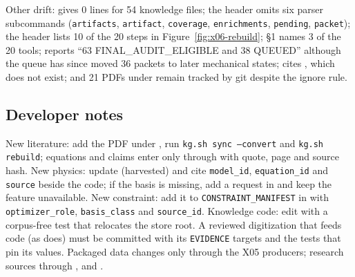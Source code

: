 
Other drift:  gives 0 lines for 54 knowledge files; the  header omits six parser subcommands (\texttt{artifacts}, \texttt{artifact}, \texttt{coverage}, \texttt{enrichments}, \texttt{pending}, \texttt{packet}); the  header lists 10 of the 20 steps in Figure~\ref{fig:x06-rebuild};  \S1 names 3 of the 20 tools;  reports ``63 FINAL\_AUDIT\_ELIGIBLE and 38 QUEUED'' although the queue has since moved 36 packets to later mechanical states;  cites , which does not exist; and 21 PDFs under  remain tracked by git despite the ignore rule.

\subsection{Developer notes}
New literature: add the PDF under , run \texttt{kg.sh sync --convert} and \texttt{kg.sh rebuild}; equations and claims enter only through  with quote, page and source hash. New physics: update  (harvested) and cite \texttt{model\_id}, \texttt{equation\_id} and \texttt{source} beside the code; if the basis is missing, add a request in  and keep the feature unavailable. New constraint: add it to \texttt{CONSTRAINT\_MANIFEST} in  with \texttt{optimizer\_role}, \texttt{basis\_class} and \texttt{source\_id}. Knowledge code: edit  with a corpus-free test that relocates the store root. A reviewed digitization that feeds code (as  does) must be committed with its \texttt{EVIDENCE} targets and the tests that pin its values. Packaged data changes only through the X05 producers; research sources through ,  and .

